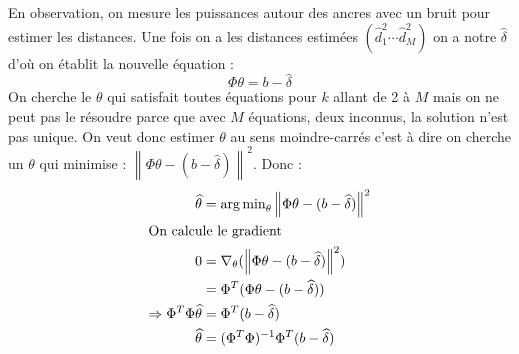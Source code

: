 \documentclass{article}
\begin{document}
En observation, on mesure les puissances autour des ancres avec un bruit pour estimer les distances. Une fois on a les distances estim\'ees	$(\widehat{d}^{2}_{1} \cdots \widehat{d}^{2}_{M})$ on a notre $\widehat{\delta}$ d'o\`u on \'etablit la nouvelle \'equation :
\[
\Phi\theta = b - \widehat{\delta}
\]
On cherche le $\theta$ qui satisfait toutes \'equations pour $k$ allant de 2 \`a $M$ mais on ne peut pas le r\'esoudre parce que avec $M$ \'equations, deux inconnus, la solution n'est pas unique. On veut donc estimer $\theta$ au sens moindre-carr\'es c'est \`a dire on cherche un $\theta$ qui minimise : $\left\|\Phi\theta - (b - \widehat{\delta})\right\|^{2}$. Donc : 
\begin{align*}
\widehat{\theta} &= \operatorname{arg\,min}_\theta \left\|\Phi\theta - (b - \widehat{\delta})\right\|^{2} \\
\intertext{On calcule le gradient}
               0 &= \nabla_{\theta}(\left\|\Phi\theta - (b - \widehat{\delta})\right\|^{2}) \\
							   &= \Phi^{T}(\Phi\theta-(b - \widehat{\delta})) \\
\Rightarrow 
\Phi^{T}\Phi\widehat{\theta} &= \Phi^{T}(b-\widehat{\delta}) \\
						\widehat{\theta} &= (\Phi^{T}\Phi)^{-1}\Phi^{T}(b-\widehat{\delta})
\end{align*} 
\end{document}
